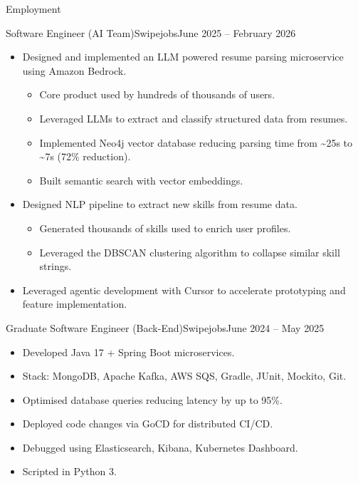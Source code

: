 \documentclass[]{mcdowellcv}
\begin{document}
\begin{cvsection}{Employment}
\begin{cvsubsection}{Software Engineer (AI Team)}{Swipejobs}{June 2025 -- February 2026}
\begin{itemize}
\item Designed and implemented an LLM powered resume parsing microservice using Amazon Bedrock.
    \begin{itemize}
    \item Core product used by hundreds of thousands of users.
    \item Leveraged LLMs to extract and classify structured data from resumes.
    \item Implemented Neo4j vector database reducing parsing time from \textasciitilde25s to \textasciitilde7s (72\% reduction).
    \item Built semantic search with vector embeddings.
    \end{itemize}
\item Designed NLP pipeline to extract new skills from resume data.
    \begin{itemize}
    \item Generated thousands of skills used to enrich user profiles.
    \item Leveraged the DBSCAN clustering algorithm to collapse similar skill strings.
    \end{itemize}
\item Leveraged agentic development with Cursor to accelerate prototyping and feature implementation.
\end{itemize}
\end{cvsubsection}

\begin{cvsubsection}{Graduate Software Engineer (Back-End)}{Swipejobs}{June 2024 -- May 2025}
    \medskip
\begin{itemize}
\item Developed Java 17 + Spring Boot microservices.
\item Stack: MongoDB, Apache Kafka, AWS SQS, Gradle, JUnit, Mockito, Git.
\item Optimised database queries reducing latency by up to 95\%.
\item Deployed code changes via GoCD for distributed CI/CD.
\item Debugged using Elasticsearch, Kibana, Kubernetes Dashboard.
\item Scripted in Python 3.
\end{itemize}
\end{cvsubsection}


\end{cvsection}
\end{document}
